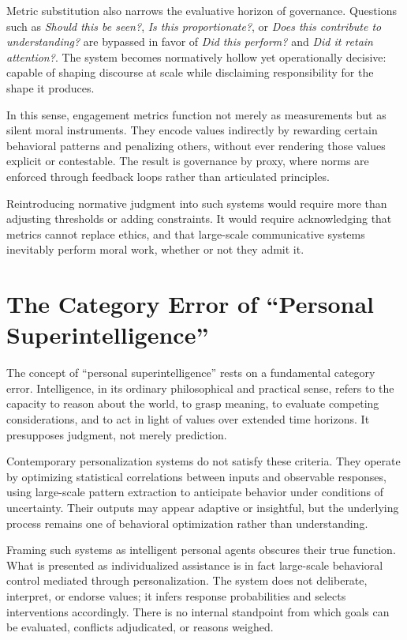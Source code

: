\documentclass[12pt]{article}
\begin{document}
Metric substitution also narrows the evaluative horizon of governance. Questions such as \emph{Should this be seen?}, \emph{Is this proportionate?}, or \emph{Does this contribute to understanding?} are bypassed in favor of \emph{Did this perform?} and \emph{Did it retain attention?}. The system becomes normatively hollow yet operationally decisive: capable of shaping discourse at scale while disclaiming responsibility for the shape it produces.

In this sense, engagement metrics function not merely as measurements but as silent moral instruments. They encode values indirectly by rewarding certain behavioral patterns and penalizing others, without ever rendering those values explicit or contestable. The result is governance by proxy, where norms are enforced through feedback loops rather than articulated principles.

Reintroducing normative judgment into such systems would require more than adjusting thresholds or adding constraints. It would require acknowledging that metrics cannot replace ethics, and that large-scale communicative systems inevitably perform moral work, whether or not they admit it.

\section{The Category Error of ``Personal Superintelligence''}

The concept of ``personal superintelligence'' rests on a fundamental category error. Intelligence, in its ordinary philosophical and practical sense, refers to the capacity to reason about the world, to grasp meaning, to evaluate competing considerations, and to act in light of values over extended time horizons. It presupposes judgment, not merely prediction.

Contemporary personalization systems do not satisfy these criteria. They operate by optimizing statistical correlations between inputs and observable responses, using large-scale pattern extraction to anticipate behavior under conditions of uncertainty. Their outputs may appear adaptive or insightful, but the underlying process remains one of behavioral optimization rather than understanding.

Framing such systems as intelligent personal agents obscures their true function. What is presented as individualized assistance is in fact large-scale behavioral control mediated through personalization. The system does not deliberate, interpret, or endorse values; it infers response probabilities and selects interventions accordingly. There is no internal standpoint from which goals can be evaluated, conflicts adjudicated, or reasons weighed.
\end{document}
